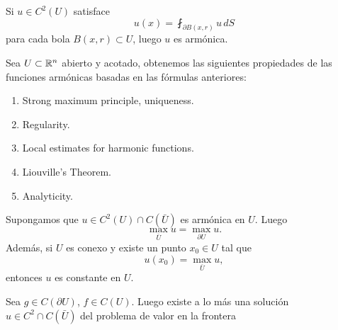 \begin{theorem}
  Si $u \in C^2(U)$ satisface
  \[
    u(x) = \fint_{\partial B(x, r)} u\, dS
  \]
  para cada bola $B(x, r) \subset U$, luego $u$ es arm\'onica.
\end{theorem}

Sea $U \subset \mathbb R^n$ abierto y acotado, obtenemos las siguientes propiedades
de las funciones arm\'onicas basadas en las f\'ormulas anteriores:
\begin{enumerate}
  \item Strong maximum principle, uniqueness.
  \item Regularity.
  \item Local estimates for harmonic functions.
  \item Liouville's Theorem.
  \item Analyticity.
\end{enumerate}

\begin{theorem}
  Supongamos que $u \in C^2(U) \cap C(\bar{U})$ es arm\'onica en $U$. Luego
  \[
    \max_{\bar{U}}   u = \max_{\partial U} u.
  \]
  Adem\'as, si $U$ es conexo y existe un punto $x_0 \in U$ tal que
  \[
    u(x_0) = \max_{\bar{U}} u,
  \]
  entonces $u$ es constante en $U$.
\end{theorem}

\begin{theorem}[Uniqueness]
  Sea $g \in C(\partial U)$, $f \in C(U)$. Luego existe a lo m\'as una soluci\'on
  $u \in C^2 \cap C(\bar{U})$ del problema de valor en la frontera
  
\end{theorem}